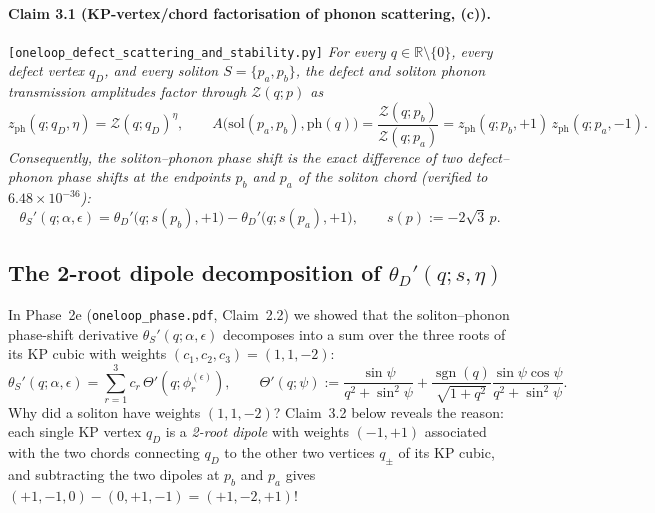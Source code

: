\documentclass[11pt,a4paper]{article}
\newcommand{\sgn}{\operatorname{sgn}}
\begin{document}
\paragraph{Claim 3.1 (KP-vertex/chord factorisation of phonon scattering, (c)).}
\texttt{[oneloop\_defect\_scattering\_and\_stability.py]}
\emph{For every $q \in \mathbb{R}\setminus\{0\}$, every defect vertex $q_D$, and
every soliton $S = \{p_a,p_b\}$, the defect and soliton phonon transmission
amplitudes factor through $\mathcal{Z}(q;p)$ as
\begin{equation}\label{eq:vertex_chord_fact}
  z_{\mathrm{ph}}(q;q_D,\eta) = \mathcal{Z}(q;q_D)^\eta, \qquad
  A\big(\mathrm{sol}(p_a,p_b),\mathrm{ph}(q)\big)
  = \frac{\mathcal{Z}(q;p_b)}{\mathcal{Z}(q;p_a)}
  = z_{\mathrm{ph}}(q;p_b,+1)\,z_{\mathrm{ph}}(q;p_a,-1).
\end{equation}
Consequently, the soliton--phonon phase shift is the exact difference of two
defect--phonon phase shifts at the endpoints $p_b$ and $p_a$ of the soliton
chord (verified to $6.48\times 10^{-36}$):
\begin{equation}\label{eq:theta_S_as_diff_theta_D}
  \theta_S'(q;\alpha,\epsilon) = \theta_D'\big(q; s(p_b), +1\big) - \theta_D'\big(q; s(p_a), +1\big),
  \qquad s(p) := -2\sqrt{3}\,p.
\end{equation}}

\subsection{The 2-root dipole decomposition of $\theta_D'(q;s,\eta)$}

In Phase~2e (\texttt{oneloop\_phase.pdf}, Claim~2.2) we showed that the
soliton--phonon phase-shift derivative $\theta_S'(q;\alpha,\epsilon)$ decomposes
into a sum over the three roots of its KP cubic with weights $(c_1,c_2,c_3) = (1,1,-2)$:
\begin{equation}\label{eq:theta_S_3root}
  \theta_S'(q;\alpha,\epsilon) = \sum_{r=1}^3 c_r\,\Theta'\!\left(q;\phi_r^{(\epsilon)}\right),
  \qquad
  \Theta'(q;\psi) := \frac{\sin\psi}{q^2+\sin^2\psi}
  + \frac{\sgn(q)}{\sqrt{1+q^2}}\frac{\sin\psi\cos\psi}{q^2+\sin^2\psi}.
\end{equation}
Why did a soliton have weights $(1,1,-2)$? Claim~3.2 below reveals the reason:
each single KP vertex $q_D$ is a \emph{2-root dipole} with weights $(-1,+1)$
associated with the two chords connecting $q_D$ to the other two vertices
$q_\pm$ of its KP cubic, and subtracting the two dipoles at $p_b$ and $p_a$
gives $(+1,-1,0) - (0,+1,-1) = (+1,-2,+1)$!
\end{document}
